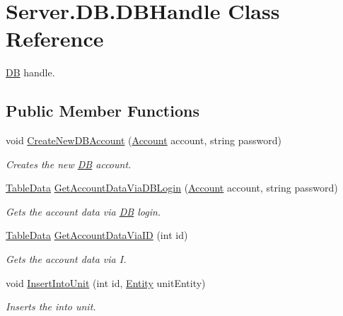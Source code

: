 \hypertarget{classServer_1_1DB_1_1DBHandle}{}\section{Server.\+D\+B.\+D\+B\+Handle Class Reference}
\label{classServer_1_1DB_1_1DBHandle}


\hyperlink{namespaceServer_1_1DB}{D\+B} handle.  


\subsection*{Public Member Functions}
\begin{DoxyCompactItemize}
\item 
void \hyperlink{classServer_1_1DB_1_1DBHandle_a81ca48e0929da58ec2ac4b55081d16c8}{Create\+New\+D\+B\+Account} (\hyperlink{classCore_1_1Models_1_1Account}{Account} account, string password)
\begin{DoxyCompactList}\small\item\em Creates the new \hyperlink{namespaceServer_1_1DB}{D\+B} account. \end{DoxyCompactList}\item 
\hyperlink{classServer_1_1DB_1_1Models_1_1TableData}{Table\+Data} \hyperlink{classServer_1_1DB_1_1DBHandle_a3a15cdbe25a8893c41f90b334ae34f66}{Get\+Account\+Data\+Via\+D\+B\+Login} (\hyperlink{classCore_1_1Models_1_1Account}{Account} account, string password)
\begin{DoxyCompactList}\small\item\em Gets the account data via \hyperlink{namespaceServer_1_1DB}{D\+B} login. \end{DoxyCompactList}\item 
\hyperlink{classServer_1_1DB_1_1Models_1_1TableData}{Table\+Data} \hyperlink{classServer_1_1DB_1_1DBHandle_aac2bf0eff5d0e0fff1bca0fd5f86fd60}{Get\+Account\+Data\+Via\+I\+D} (int id)
\begin{DoxyCompactList}\small\item\em Gets the account data via I. \end{DoxyCompactList}\item 
void \hyperlink{classServer_1_1DB_1_1DBHandle_ab381614c199bdf2782df0c69e99edfb4}{Insert\+Into\+Unit} (int id, \hyperlink{classCore_1_1Models_1_1Entity}{Entity} unit\+Entity)
\begin{DoxyCompactList}\small\item\em Inserts the into unit. \end{DoxyCompactList}\item 

\end{DoxyCompactItemize}
